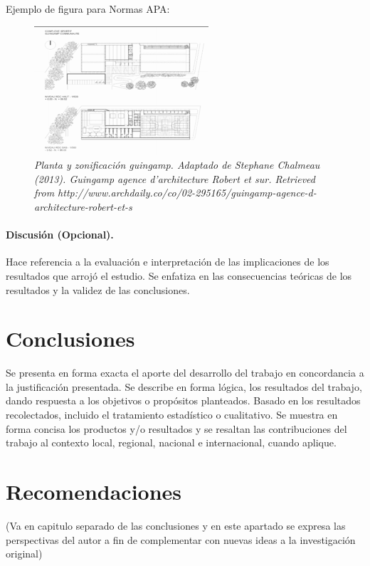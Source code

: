 \documentclass[11pt,openany]{book}
\begin{document}
Ejemplo de figura para Normas APA:

\begin{figure}[H]
    \centering
    \includegraphics[width=.5\linewidth]{Ejemplo APA.png}
    \caption{\justifying \textit{Planta y zonificación guingamp. Adaptado de Stephane Chalmeau (2013). Guingamp agence d'architecture Robert et sur. Retrieved from http://www.archdaily.co/co/02-295165/guingamp-agence-d-architecture-robert-et-s}}
    \label{fig:Planta y zonificación guingamp}
\end{figure}

\subsubsection{Discusión (Opcional).}

Hace referencia a la evaluación e interpretación de las implicaciones de los resultados que arrojó el estudio. Se enfatiza en las consecuencias teóricas de los resultados y la validez de las conclusiones.

\chapter{Conclusiones}

Se presenta en forma exacta el aporte del desarrollo del trabajo en concordancia a la justificación presentada. Se describe en forma lógica, los resultados del trabajo, dando respuesta a los objetivos o propósitos planteados. Basado en los resultados recolectados, incluido el tratamiento estadístico o cualitativo. Se muestra en forma concisa los productos y/o resultados y se resaltan las contribuciones del trabajo al contexto local, regional, nacional e internacional, cuando aplique.

\chapter{Recomendaciones}

\begin{center}
    (Va en capitulo separado de las conclusiones y en este apartado se expresa las perspectivas del autor a fin de complementar con nuevas ideas a la investigación original)
\end{center}
\end{document}

